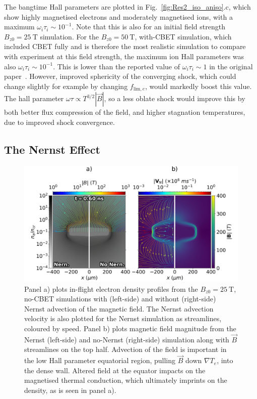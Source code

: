 The bangtime Hall parameters are plotted in Fig.~\ref{fig:Res2_iso_aniso}.c, which show highly magnetised electrons and moderately magnetised ions, with a maximum $\omega_i\tau_i\sim10^{-1}$.
Note that this is also for an initial field strength $B_{z0}=25\ \text{T}$ simulation.
For the $B_{z0}=50\ \text{T}$, with-\ac{CBET} simulation, which included \ac{CBET} fully and is therefore the most realistic simulation to compare with experiment at this field strength, the maximum ion Hall parameters was also $\omega_i\tau_i\sim10^{-1}$.
This is lower than the reported value of $\omega_i\tau_i\sim1$ in the original paper~\cite{bose_effect_2022}.
However, improved sphericity of the converging shock, which could change slightly for example by changing $f_{\text{lim},e}$, would markedly boost this value.
The hall parameter $\omega\tau\propto T^{3/2}|\vec{B}|$, so a less oblate shock would improve this by both better flux compression of the field, and higher stagnation temperatures, due to improved shock convergence.

\subsection{The Nernst Effect}%
\label{sec:Res2_nernst}

\begin{figure}[t!]
    \includegraphics[width=0.8\linewidth]{Results2/Images/nernst_comp_Bstream.png}
    \centering
    \caption{Panel a) plots in-flight electron density profiles from the $B_{z0}=25\ \text{T}$, no-\ac{CBET} simulations with (left-side) and without (right-side) Nernst advection of the magnetic field.
    The Nernst advection velocity is also plotted for the Nernst simulation as streamlines, coloured by speed.
    Panel b) plots magnetic field magnitude from the Nernst (left-side) and no-Nernst (right-side) simulation along with $\vec{B}$ streamlines on the top half.
    Advection of the field is important in the low Hall parameter equatorial region, pulling $\vec{B}$ down $\nabla T_e$, into the dense wall.
    Altered field at the equator impacts on the magnetised thermal conduction, which ultimately imprints on the density, as is seen in panel a).}%
    \label{fig:Res2_nernst_comp}
\end{figure}

